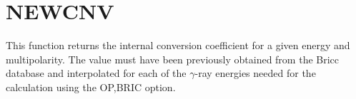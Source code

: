 \section{NEWCNV}
\label{sect:newcnv}

\noindent This function returns the internal conversion coefficient for a
given energy and multipolarity. The value must have been previously obtained
from the Bricc database and interpolated for each of the $\gamma$-ray
energies needed for the calculation using the OP,BRIC option.\\
